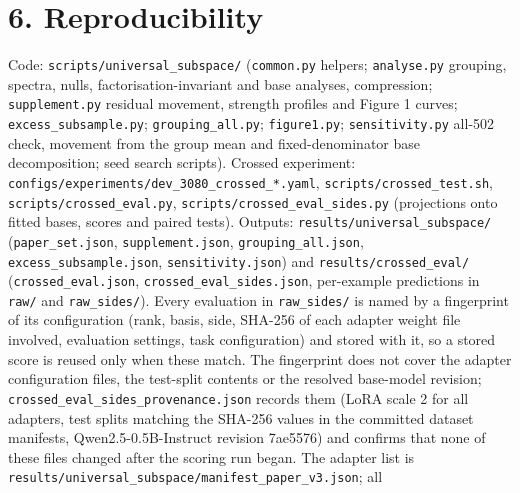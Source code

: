 \documentclass[
  11pt,
]{article}
\newcounter{none} %
\begin{document}
\section{6. Reproducibility}\label{reproducibility}

Code: \texttt{scripts/\allowbreak{}universal\_\allowbreak{}subspace/\allowbreak{}} (\texttt{common.py} helpers;
\texttt{analyse.py} grouping, spectra, nulls, factorisation-invariant
and base analyses, compression; \texttt{supplement.py} residual
movement, strength profiles and Figure 1 curves;
\texttt{excess\_\allowbreak{}subsample.py}; \texttt{grouping\_\allowbreak{}all.py};
\texttt{figure1.py}; \texttt{sensitivity.py} all-502 check, movement
from the group mean and fixed-denominator base decomposition; seed
search scripts). Crossed experiment:
\texttt{configs/\allowbreak{}experiments/\allowbreak{}dev\_\allowbreak{}3080\_\allowbreak{}crossed\_\allowbreak{}*.yaml},
\texttt{scripts/\allowbreak{}crossed\_\allowbreak{}test.sh}, \texttt{scripts/\allowbreak{}crossed\_\allowbreak{}eval.py},
\texttt{scripts/\allowbreak{}crossed\_\allowbreak{}eval\_\allowbreak{}sides.py} (projections onto fitted bases,
scores and paired tests). Outputs: \texttt{results/\allowbreak{}universal\_\allowbreak{}subspace/\allowbreak{}}
(\texttt{paper\_\allowbreak{}set.json}, \texttt{supplement.json},
\texttt{grouping\_\allowbreak{}all.json}, \texttt{excess\_\allowbreak{}subsample.json},
\texttt{sensitivity.json}) and \texttt{results/\allowbreak{}crossed\_\allowbreak{}eval/\allowbreak{}}
(\texttt{crossed\_\allowbreak{}eval.json}, \texttt{crossed\_\allowbreak{}eval\_\allowbreak{}sides.json},
per-example predictions in \texttt{raw/\allowbreak{}} and \texttt{raw\_\allowbreak{}sides/\allowbreak{}}).
Every evaluation in \texttt{raw\_\allowbreak{}sides/\allowbreak{}} is named by a fingerprint of
its configuration (rank, basis, side, SHA-256 of each adapter weight
file involved, evaluation settings, task configuration) and stored with
it, so a stored score is reused only when these match. The fingerprint
does not cover the adapter configuration files, the test-split contents
or the resolved base-model revision;
\texttt{crossed\_\allowbreak{}eval\_\allowbreak{}sides\_\allowbreak{}provenance.json} records them (LoRA scale
2 for all adapters, test splits matching the SHA-256 values in the
committed dataset manifests, Qwen2.5-0.5B-Instruct revision 7ae5576) and
confirms that none of these files changed after the scoring run began.
The adapter list is
\texttt{results/\allowbreak{}universal\_\allowbreak{}subspace/\allowbreak{}manifest\_\allowbreak{}paper\_\allowbreak{}v3.json}; all
\end{document}

